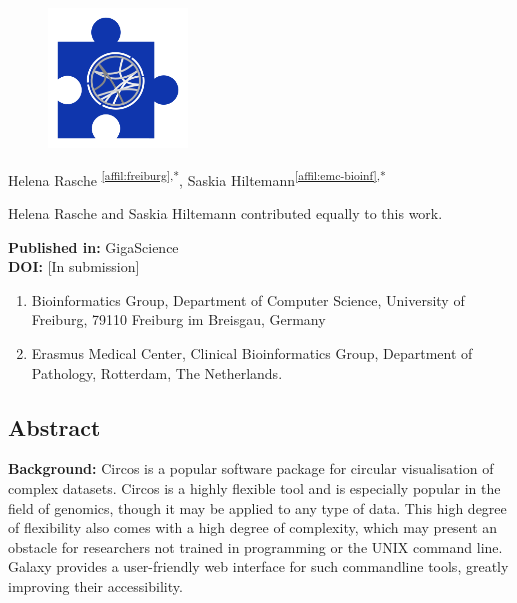 \setcounter{NAT@ctr}{-1}
\chapter*{}

\begin{figure}[t!]
\centering
\includegraphics[height=10em]{frontmatter/images/chapter-header-circos.png}
\end{figure}
\vspace{-4cm}



Helena Rasche \textsuperscript{\ref{affil:freiburg},*},
Saskia Hiltemann\textsuperscript{\ref{affil:emc-bioinf},*}

{\color{chaptergrey}{*}} Helena Rasche and Saskia Hiltemann contributed equally to this work.

\textbf{Published in:} GigaScience \\
\textbf{DOI:} [In submission]

\small
\begin{enumerate}
 \itemsep-0.5em
 \item Bioinformatics Group, Department of Computer Science, University of Freiburg, 79110 Freiburg im Breisgau, Germany\label{affil:freiburg}
 \item Erasmus Medical Center, Clinical Bioinformatics Group, Department of Pathology, Rotterdam, The Netherlands.\label{affil:emc-bioinf}
\end{enumerate}



\section*{Abstract}

\textbf{Background:} Circos is a popular software package for circular visualisation of complex datasets. Circos is a highly flexible tool and is especially popular in the field of genomics, though it may be applied to any type of data. This high degree of flexibility also comes with a high degree of complexity, which may present an obstacle for researchers not trained in programming or the UNIX command line. Galaxy provides a user-friendly web interface for such commandline tools, greatly improving their accessibility.

